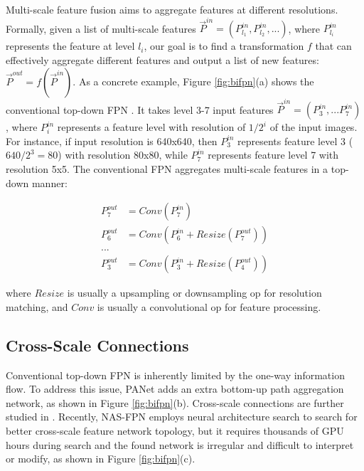 \documentclass[10pt,twocolumn,letterpaper]{article}
\begin{document}
Multi-scale feature fusion aims to aggregate features at different resolutions. Formally, given a list of multi-scale features  $\vec{P}^{in} = (P^{in}_{l_1}, P^{in}_{l_2}, ...)$, where $P^{in}_{l_i}$ represents the feature at level $l_i$, our goal is to find a transformation $f$ that can effectively aggregate different features and output a list of new features: $\vec{P}^{out} = f(\vec{P}^{in})$. As a concrete example, Figure \ref{fig:bifpn}(a) shows the conventional top-down FPN \cite{fpn17}. It takes level 3-7 input features $\vec{P}^{in} = (P^{in}_{3}, ... P^{in}_{7})$, where $P^{in}_{i}$ represents a feature level with resolution of $1/2^i$ of the input images. For instance, if input resolution is 640x640, then $P^{in}_{3}$ represents feature level 3 ($640/2^3=80$) with resolution 80x80, while  $P^{in}_{7}$ represents feature level 7 with resolution 5x5.  The conventional FPN aggregates multi-scale features in a top-down manner:

\begin{align*}
P^{out}_7 &= Conv(P^{in}_7)  \\
P^{out}_6 &= Conv(P^{in}_6 + Resize(P^{out}_7)) \\
... \\
P^{out}_3 &= Conv(P^{in}_3 + Resize(P^{out}_4))
\end{align*}

\noindent where $Resize$  is usually a upsampling or downsampling op for resolution matching, and
$Conv$ is usually a convolutional op for feature processing.




\subsection{Cross-Scale Connections}
\label{subsec:connection}

Conventional top-down FPN  is inherently limited by the one-way information flow. To address this issue, PANet \cite{panet18} adds an extra bottom-up path aggregation network, as shown in Figure \ref{fig:bifpn}(b). Cross-scale connections are further studied in \cite{deepfpn18,parallelFPN18, m2det19}. Recently, NAS-FPN \cite{nasfpn19} employs neural architecture search to search for better cross-scale feature network topology, but it requires thousands of GPU hours during search and the found network is irregular and difficult to interpret or modify, as shown in Figure \ref{fig:bifpn}(c).
\end{document}
